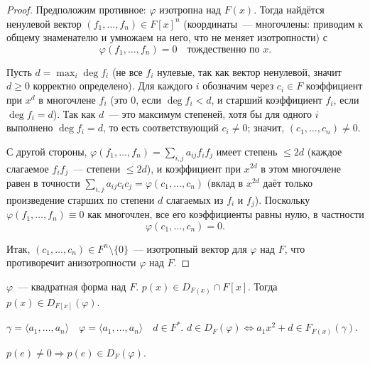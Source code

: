 \documentclass[12pt]{article}
\begin{document}
    \begin{proof}
    	Предположим противное: $\varphi$ изотропна над $F(x)$. Тогда найдётся ненулевой вектор $(f_1, \ldots, f_n) \in F[x]^n$ (координаты~--- многочлены: приводим к общему знаменателю и умножаем на него, что не меняет изотропности) с
    	\[
    	\varphi(f_1, \ldots, f_n) = 0 \quad \text{тождественно по } x.
    	\]
    	
    	Пусть $d = \max_i \deg f_i$ (не все $f_i$ нулевые, так как вектор ненулевой, значит $d \geqslant 0$ корректно определено). Для каждого $i$ обозначим через $c_i \in F$ коэффициент при $x^d$ в многочлене $f_i$ (это $0$, если $\deg f_i < d$, и старший коэффициент $f_i$, если $\deg f_i = d$). Так как $d$~--- это максимум степеней, хотя бы для одного $i$ выполнено $\deg f_i = d$, то есть соответствующий $c_i \neq 0$; значит, $(c_1, \ldots, c_n) \neq 0$.
    	
    	С другой стороны, $\varphi(f_1, \ldots, f_n) = \sum_{i,j} a_{ij} f_i f_j$ имеет степень $\leqslant 2d$ (каждое слагаемое $f_if_j$~--- степени $\leqslant 2d$), и коэффициент при $x^{2d}$ в этом многочлене равен в точности $\sum_{i,j} a_{ij} c_i c_j = \varphi(c_1, \ldots, c_n)$ (вклад в $x^{2d}$ даёт только произведение старших по степени $d$ слагаемых из $f_i$ и $f_j$). Поскольку $\varphi(f_1, \ldots, f_n) \equiv 0$ как многочлен, все его коэффициенты равны нулю, в частности
    	\[
    	\varphi(c_1, \ldots, c_n) = 0.
    	\]
    	
    	Итак, $(c_1, \ldots, c_n) \in F^n \setminus \{0\}$~--- изотропный вектор для $\varphi$ над $F$, что противоречит анизотропности $\varphi$ над $F$.
    \end{proof}
    
    \begin{theorem}
    	$\varphi$~--- квадратная форма над $F$. $p(x) \in D_{F(x)} \cap F[x]$. Тогда $p(x) \in D_{F[x]}(\varphi)$.
    \end{theorem}
    
    \begin{corollary}
    	$\gamma = \langle a_1, \dots, a_n \rangle \quad \varphi = \langle a_1, \dots, a_n \rangle \quad d \in F^*$. $d \in D_F (\varphi) \Leftrightarrow a_1x^2 + d \in F_{F(x)}(\gamma)$.
    \end{corollary}
    
    \begin{corollary}
    	$p(e) \ne 0 \Rightarrow p(e) \in D_F(\varphi)$.
    \end{corollary}
    
\end{document}
